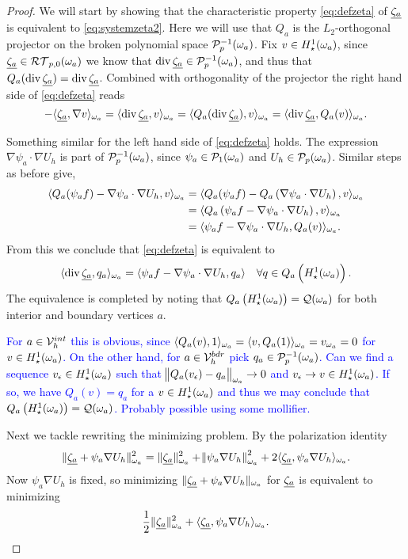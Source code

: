 \documentclass[thesis.tex]{subfiles}
\begin{document}
\begin{proof}
  We will start by showing that the characteristic property \eqref{eq:defzeta}  of $\underline{\zeta_a}$ is equivalent to \eqref{eq:systemzeta2}.
  Here we will use that $Q_a$ is the $L_2$-orthogonal projector on the broken polynomial space $\mathcal{P}_p^{-1}(\omega_a)$.  Fix $v \in H_\star^1(\omega_a)$, 
  since $\underline{\zeta_a} \in \mathcal{RT}_{p,0}(\omega_a)$ we know that $\operatorname{div} \underline{\zeta_a} \in \mathcal{P}_p^{-1}(\omega_a)$, and thus that $Q_a( \operatorname{div} \underline{\zeta_a} )= \operatorname{div} \underline{\zeta_a}$. Combined with orthogonality of the projector the right hand side of \eqref{eq:defzeta} reads
  \[
    -\langle \underline{\zeta_a}, \nabla v \rangle_{\omega_a} = \langle \operatorname{div} \underline{\zeta_a}, v \rangle_{\omega_a} = \langle  Q_a(\operatorname{div} \underline{\zeta_a}), v \rangle_{\omega_a} = \langle \operatorname{div} \underline{\zeta_a}, Q_a(v) \rangle_{\omega_a}.
  \]

  Something similar for the left hand side of \eqref{eq:defzeta} holds. The expression $\nabla \psi_a \cdot \nabla U_h$ is part of
  $\mathcal{P}_p^{-1}(\omega_a)$, since $\psi_a \in \mathcal{P}_1(\omega_a)$ and $U_h \in \mathcal{P}_{p}(\omega_a)$. Similar steps as before give, 
  \begin{align*}
    \langle Q_a(\psi_a f) - \nabla \psi_a \cdot \nabla U_h, v \rangle_{\omega_a} &= \langle Q_a(\psi_a f) - Q_a\left(\nabla \psi_a \cdot \nabla U_h\right),v \rangle_{\omega_a}\\
    &= \langle Q_a\left(\psi_a f - \nabla \psi_a \cdot \nabla U_h\right), v \rangle_{\omega_a}\\
    &= \langle \psi_a f - \nabla \psi_a \cdot \nabla U_h, Q_a(v) \rangle_{\omega_a}.
  \end{align*}
  From this we conclude that \eqref{eq:defzeta} is equivalent to
  \[
    \langle \operatorname{div} \underline{\zeta_a}, q_a \rangle_{\omega_a} = \langle \psi_a f - \nabla \psi_a \cdot \nabla U_h, q_a \rangle \quad \forall q \in Q_a\left(H_\star^1(\omega_a)\right).
  \]
  The equivalence is completed by  noting that $Q_a\left(H_\star^1(\omega_a)\right) = \mathcal{Q}(\omega_a)$ for both interior and boundary vertices $a$.

  \textcolor{blue}{
  For $a \in \mathcal{V}_h^{int}$ this is obvious, 
  since $\langle Q_a(v), 1 \rangle_{\omega_a} = \langle v,Q_a(1) \rangle_{\omega_a} = v_{\omega_a} = 0$ for $v \in H_\star^1(\omega_a)$.
  On the other hand, for $a \in \mathcal{V}_h^{bdr}$ pick $q_a \in \mathcal{P}_p^{-1}(\omega_a)$.
  Can we find a sequence $v_\epsilon \in H_\star^1(\omega_a)$ such that $\norm{Q_a(v_\epsilon) - q_a}_{\omega_a} \to 0$ 
  and $v_\epsilon \to v \in H_\star^1(\omega_a)$. If so, we have $Q_a(v) = q_a$ for a $v \in H_\star^1(\omega_a)$ and thus we may conclude
  that $Q_a\left(H_\star^1(\omega_a)\right) = \mathcal{Q}(\omega_a)$. Probably possible using some mollifier.  }

  Next we tackle rewriting the minimizing problem. By the polarization identity
  \[
    \| \underline{\zeta_a} + \psi_a \nabla U_h \|_{\omega_a}^2 = \| \underline{\zeta_a} \|_{\omega_a}^2 + \norm{\psi_a \nabla U_h}^2_{\omega_a} + 2 \langle \underline{\zeta_a}, \psi_a \nabla 
    U_h \rangle_{\omega_a}.
  \]
  Now $\psi_a \nabla U_h$ is fixed,  so minimizing $\| \underline{\zeta_a} + \psi_a \nabla U_h \|_{\omega_a}$ for $\underline{\zeta_a}$ is equivalent to minimizing
  \[
    \frac{1}{2} \| \underline{\zeta_a} \|^2_{\omega_a} + \langle \underline{\zeta_a}, \psi_a \nabla U_h \rangle_{\omega_a}.
  \]


\end{proof}
\end{document}
